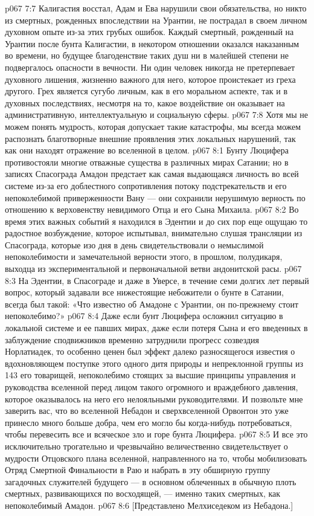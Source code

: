 \vs p067 7:7 Калигастия восстал, Адам и Ева нарушили свои обязательства, но никто из смертных, рожденных впоследствии на Урантии, не пострадал в своем личном духовном опыте из\hyp{}за этих грубых ошибок. Каждый смертный, рожденный на Урантии после бунта Калигастии, в некотором отношении оказался наказанным во времени, но будущее благоденствие таких душ ни в малейшей степени не подвергалось опасности в вечности. Ни один человек никогда не претерпевает духовного лишения, жизненно важного для него, которое проистекает из греха другого. Грех является сугубо личным, как в его моральном аспекте, так и в духовных последствиях, несмотря на то, какое воздействие он оказывает на административную, интеллектуальную и социальную сферы.
\vs p067 7:8 \pc Хотя мы не можем понять мудрость, которая допускает такие катастрофы, мы всегда можем распознать благотворные внешние проявления этих локальных нарушений, так как они находят отражение во вселенной в целом.
\vs p067 8:1 Бунту Люцифера противостояли многие отважные существа в различных мирах Сатании; но в записях Спасограда Амадон предстает как самая выдающаяся личность во всей системе из\hyp{}за его доблестного сопротивления потоку подстрекательств и его непоколебимой приверженности Вану --- они сохранили нерушимую верность по отношению к верховенству невидимого Отца и его Сына Михаила.
\vs p067 8:2 Во время этих важных событий я находился в Эдентии и до сих пор еще ощущаю то радостное возбуждение, которое испытывал, внимательно слушая трансляции из Спасограда, которые изо дня в день свидетельствовали о немыслимой непоколебимости и замечательной верности этого, в прошлом, полудикаря, выходца из экспериментальной и первоначальной ветви андонитской расы.
\vs p067 8:3 На Эдентии, в Спасограде и даже в Уверсе, в течение семи долгих лет первый вопрос, который задавали все нижестоящие небожители о бунте в Сатании, всегда был такой: «Что известно об Амадоне с Урантии, он по\hyp{}прежнему стоит непоколебимо?»
\vs p067 8:4 Даже если бунт Люцифера осложнил ситуацию в локальной системе и ее павших мирах, даже если потеря Сына и его введенных в заблуждение сподвижников временно затруднили прогресс созвездия Норлатиадек, то особенно ценен был эффект далеко разносящегося известия о вдохновляющем поступке этого одного дитя природы и непреклонной группы из 143 его товарищей, непоколебимо стоящих за высшие принципы управления и руководства вселенной перед лицом такого огромного и враждебного давления, которое оказывалось на него его нелояльными руководителями. И позвольте мне заверить вас, что во вселенной Небадон и сверхвселенной Орвонтон это уже принесло много больше добра, чем его могло бы когда\hyp{}нибудь потребоваться, чтобы перевесить все и всяческое зло и горе бунта Люцифера.
\vs p067 8:5 И все это исключительно трогательно и чрезвычайно величественно свидетельствует о мудрости Отцовского плана вселенной, направленного на то, чтобы мобилизовать Отряд Смертной Финальности в Раю и набрать в эту обширную группу загадочных служителей будущего --- в основном облеченных в обычную плоть смертных, развивающихся по восходящей, --- именно таких смертных, как непоколебимый Амадон.
\vsetoff
\vs p067 8:6 [Представлено Мелхиседеком из Небадона.]
